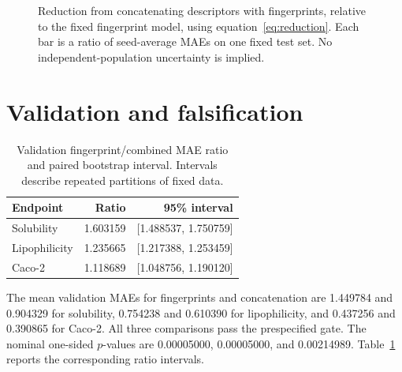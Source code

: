\documentclass[10pt,twocolumn,a4paper]{article}
\theoremstyle{definition}\newtheorem{observation}{Numerical observation}
\theoremstyle{remark}\newtheorem{remark}{Remark}
\begin{document}
\begin{figure}[t]
\centering
{}
\caption{Reduction from concatenating descriptors with fingerprints, relative to the fixed fingerprint model, using equation~\eqref{eq:reduction}. Each bar is a ratio of seed-average MAEs on one fixed test set. No independent-population uncertainty is implied.}\label{fig:reduction}
\end{figure}

\section{Validation and falsification}\label{sec:validation}
\begin{table}[t]
\centering\small
\caption{Validation fingerprint/combined MAE ratio and paired bootstrap interval. Intervals describe repeated partitions of fixed data.}\label{tab:valid}
\begin{tabular}{lrr}\toprule
Endpoint & Ratio & 95\% interval\\\midrule
Solubility & 1.603159 & [1.488537, 1.750759]\\
Lipophilicity & 1.235665 & [1.217388, 1.253459]\\
Caco-2 & 1.118689 & [1.048756, 1.190120]\\\bottomrule
\end{tabular}
\end{table}
The mean validation MAEs for fingerprints and concatenation are 1.449784 and 0.904329 for solubility, 0.754238 and 0.610390 for lipophilicity, and 0.437256 and 0.390865 for Caco-2. All three comparisons pass the prespecified gate. The nominal one-sided $p$-values are 0.00005000, 0.00005000, and 0.00214989. Table~\ref{tab:valid} reports the corresponding ratio intervals.
\end{document}
